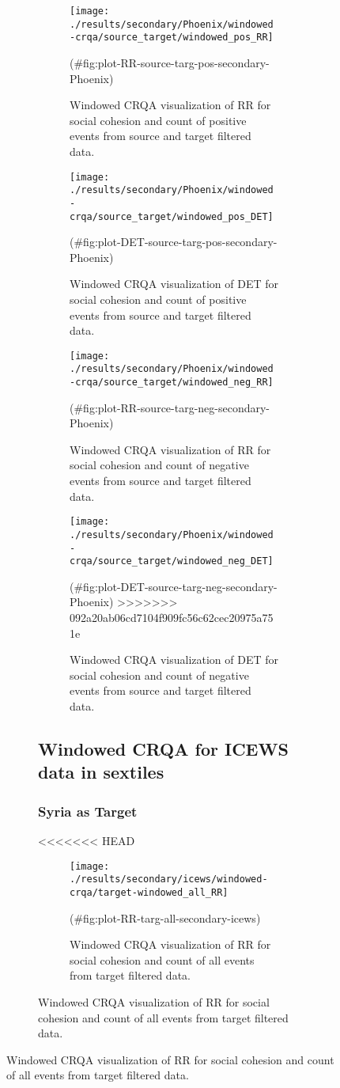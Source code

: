 \begin{appendix}
\begin{figure}
\begin{figure}
\begin{figure}[!h]
\texttt{[image: ./results/secondary/Phoenix/windowed-crqa/source\_target/windowed\_pos\_RR]} \caption{Windowed CRQA visualization of RR for social cohesion and count of positive events from source and target filtered data.}(\#fig:plot-RR-source-targ-pos-secondary-Phoenix)
\end{figure}

\begin{figure}[!h]
\texttt{[image: ./results/secondary/Phoenix/windowed-crqa/source\_target/windowed\_pos\_DET]} \caption{Windowed CRQA visualization of DET for social cohesion and count of positive events from source and target filtered data.}(\#fig:plot-DET-source-targ-pos-secondary-Phoenix)
\end{figure}

\begin{figure}[!h]
\texttt{[image: ./results/secondary/Phoenix/windowed-crqa/source\_target/windowed\_neg\_RR]} \caption{Windowed CRQA visualization of RR for social cohesion and count of negative events from source and target filtered data.}(\#fig:plot-RR-source-targ-neg-secondary-Phoenix)
\end{figure}

\begin{figure}[!h]
\texttt{[image: ./results/secondary/Phoenix/windowed-crqa/source\_target/windowed\_neg\_DET]} \caption{Windowed CRQA visualization of DET for social cohesion and count of negative events from source and target filtered data.}(\#fig:plot-DET-source-targ-neg-secondary-Phoenix)
>>>>>>> 092a20ab06cd7104f909fc56c62cec20975a751e
\end{figure}

\hypertarget{windowed-crqa-for-icews-data-in-sextiles}{%
\subsection{Windowed CRQA for ICEWS data in
sextiles}\label{windowed-crqa-for-icews-data-in-sextiles}}

\hypertarget{syria-as-target-1}{%
\subsubsection{Syria as Target}\label{syria-as-target-1}}

<<<<<<< HEAD
\begin{figure}
\texttt{[image: ./results/secondary/icews/windowed-crqa/target-windowed\_all\_RR]} \caption{Windowed CRQA visualization of RR for social cohesion and count of all events from target filtered data.}(\#fig:plot-RR-targ-all-secondary-icews)
\end{figure}


\end{figure}
\end{figure}
\end{appendix}
